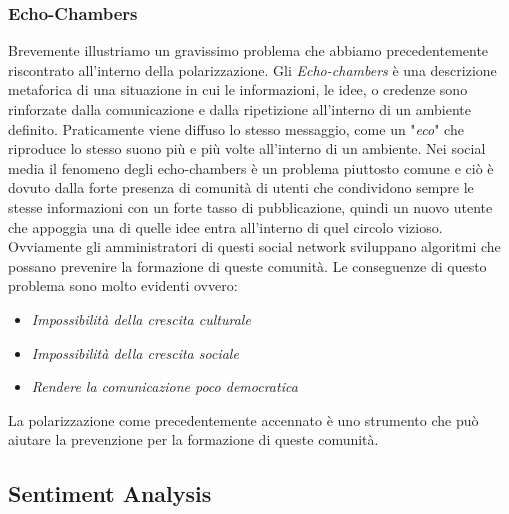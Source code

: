 \subsubsection{Echo-Chambers}
Brevemente illustriamo un gravissimo problema che abbiamo precedentemente riscontrato all'interno della polarizzazione.
Gli \textit{Echo-chambers} è una descrizione metaforica di una situazione in cui le informazioni, le idee, o credenze sono rinforzate dalla comunicazione e dalla ripetizione all'interno di un ambiente definito. Praticamente viene diffuso lo stesso messaggio, come un "\textit{eco}" che riproduce lo stesso suono più e più volte all'interno di un ambiente\cite{echo}. 
Nei social media il fenomeno degli echo-chambers è un problema piuttosto comune e ciò è dovuto dalla forte presenza di comunità di utenti che condividono sempre le stesse informazioni con un forte tasso di pubblicazione, quindi un nuovo utente che appoggia una di quelle idee entra all'interno di quel circolo vizioso. Ovviamente gli amministratori di questi social network sviluppano algoritmi che possano prevenire la formazione di queste comunità.
Le conseguenze di questo problema sono molto evidenti ovvero:
\begin{itemize}
\item \textit{Impossibilità della crescita culturale}
\item \textit{Impossibilità della crescita sociale}
\item \textit{Rendere la comunicazione poco democratica}
\end{itemize}
La polarizzazione come precedentemente accennato è uno strumento che può aiutare la prevenzione per la formazione di queste comunità.

\subsection{Sentiment Analysis}

